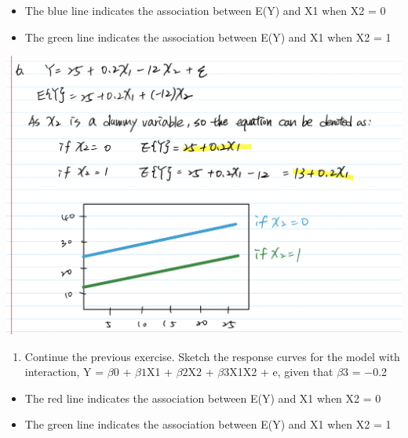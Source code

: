 \documentclass[
]{article}
\providecommand{\tightlist}{%
  \setlength{\itemsep}{0pt}\setlength{\parskip}{0pt}}
\begin{document}
\begin{itemize}
\tightlist
\item
  The blue line indicates the association between E(Y) and X1 when X2 =
  0
\item
  The green line indicates the association between E(Y) and X1 when X2 =
  1
\end{itemize}

\includegraphics{pics/6.png}

\begin{enumerate}
\def\labelenumi{\arabic{enumi}.}
\setcounter{enumi}{6}
\tightlist
\item
  Continue the previous exercise. Sketch the response curves for the
  model with interaction, Y = \(\beta0\) + \(\beta1\)X1 + \(\beta2\)X2 +
  \(\beta3\)X1X2 + e, given that \(\beta3\) = −0.2
\end{enumerate}

\begin{itemize}
\tightlist
\item
  The red line indicates the association between E(Y) and X1 when X2 = 0
\item
  The green line indicates the association between E(Y) and X1 when X2 =
  1
\end{itemize}
\end{document}
